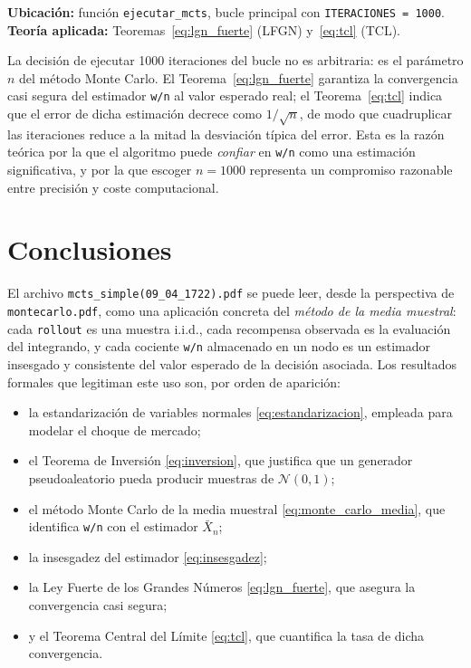 \documentclass[11pt,a4paper]{article}
\theoremstyle{definition}
\begin{document}
\textbf{Ubicación:} función \texttt{ejecutar\_mcts}, bucle principal con \texttt{ITERACIONES = 1000}.\\
\textbf{Teoría aplicada:} Teoremas~\ref{eq:lgn_fuerte} (LFGN) y~\ref{eq:tcl} (TCL).

La decisión de ejecutar 1000 iteraciones del bucle no es arbitraria: es el parámetro $n$ del método Monte Carlo. El Teorema~\ref{eq:lgn_fuerte} garantiza la convergencia casi segura del estimador \texttt{w/n} al valor esperado real; el Teorema~\ref{eq:tcl} indica que el error de dicha estimación decrece como $1/\sqrt{n}$, de modo que cuadruplicar las iteraciones reduce a la mitad la desviación típica del error. Esta es la razón teórica por la que el algoritmo puede \emph{confiar} en \texttt{w/n} como una estimación significativa, y por la que escoger $n=1000$ representa un compromiso razonable entre precisión y coste computacional.

\section{Conclusiones}

El archivo \texttt{mcts\_simple(09\_04\_1722).pdf} se puede leer, desde la perspectiva de \texttt{montecarlo.pdf}, como una aplicación concreta del \emph{método de la media muestral}: cada \texttt{rollout} es una muestra i.i.d., cada recompensa observada es la evaluación del integrando, y cada cociente \texttt{w/n} almacenado en un nodo es un estimador insesgado y consistente del valor esperado de la decisión asociada. Los resultados formales que legitiman este uso son, por orden de aparición:

\begin{itemize}[leftmargin=1.4em]
    \item la estandarización de variables normales \eqref{eq:estandarizacion}, empleada para modelar el choque de mercado;
    \item el Teorema de Inversión \eqref{eq:inversion}, que justifica que un generador pseudoaleatorio pueda producir muestras de $\mathcal{N}(0,1)$;
    \item el método Monte Carlo de la media muestral \eqref{eq:monte_carlo_media}, que identifica \texttt{w/n} con el estimador $\bar X_n$;
    \item la insesgadez del estimador \eqref{eq:insesgadez};
    \item la Ley Fuerte de los Grandes Números \eqref{eq:lgn_fuerte}, que asegura la convergencia casi segura;
    \item y el Teorema Central del Límite \eqref{eq:tcl}, que cuantifica la tasa de dicha convergencia.
\end{itemize}
\end{document}
